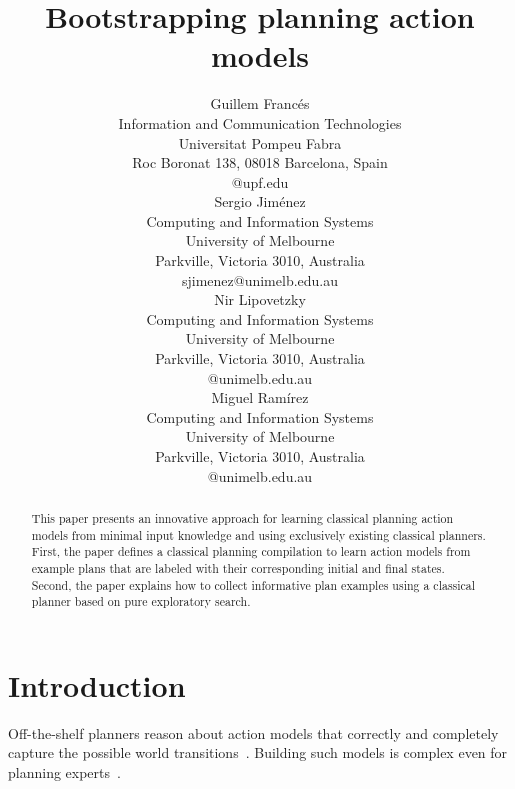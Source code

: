 \documentclass[letterpaper]{article} %
\begin{document}
\title{Bootstrapping planning action models}

\author{Guillem Franc\'es\\
{\small Information and Communication Technologies}\\
{\small Universitat Pompeu Fabra}\\
{\small Roc Boronat 138, 08018 Barcelona, Spain}\\
{\small @upf.edu}\\
\And Sergio Jim\'enez\\
{\small Computing and Information Systems}\\
{\small University of Melbourne}\\
{\small Parkville, Victoria 3010, Australia}\\
{\small sjimenez@unimelb.edu.au}\\
\And Nir Lipovetzky\\
{\small Computing and Information Systems}\\
{\small University of Melbourne}\\
{\small Parkville, Victoria 3010, Australia}\\
{\small @unimelb.edu.au}\\
\And Miguel Ram\'irez\\
{\small Computing and Information Systems}\\
{\small University of Melbourne}\\
{\small Parkville, Victoria 3010, Australia}\\
{\small @unimelb.edu.au}\\
}

\maketitle
\begin{abstract}
This paper presents an innovative approach for learning classical planning action models from minimal input knowledge and using exclusively existing classical planners. First, the paper defines a classical planning compilation to learn action models from example plans that are labeled with their corresponding initial and final states. Second, the paper explains how to collect informative plan examples using a classical planner based on pure exploratory search. 
\end{abstract}


\section{Introduction}
Off-the-shelf planners reason about action models that correctly and completely capture the possible world transitions~\cite{geffner:book:2013}. Building such models is complex even for planning experts~\cite{kambhampati:modellite:AAAI2007}.
\end{document}
